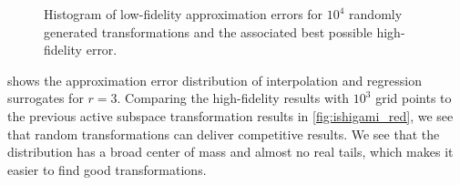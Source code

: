 \documentclass[
  a4paper,  %
  twoside,  %
  bibliography=totoc,
  headsepline,
  cleardoublepage=empty,
  parskip=half,
  draft=false
]{scrbook}
\begin{document}
\begin{mdframed}[style=style]
\begin{figure}[H]
\begin{subfigure}[H]{.5\textwidth}
\vspace{3mm}
  \label{fig:ishigami_hist_3}
\end{subfigure}
\delimit
  \caption{Histogram of low-fidelity approximation errors for $10^4$ randomly generated transformations and the associated best possible high-fidelity error.}
\label{fig:ishigami_hists_pres}
\end{figure}
\end{mdframed}
%
 shows the approximation error distribution of interpolation and regression surrogates for $r=3$.
Comparing the high-fidelity results with $10^3$ grid points to the previous active subspace transformation results in \cref{fig:ishigami_red}, we see that random transformations can deliver competitive results.
We see that the distribution has a broad center of mass and almost no real tails, which makes it easier to find good transformations.
\end{document}
